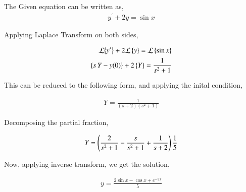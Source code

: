 \documentclass[journal]{IEEEtran}
\begin{document}


    



    
    The Given equation can be written as,
    \begin{align}
        y^\prime + 2y = \sin{x}
    \end{align}

    Applying Laplace Transform on both sides,

    \begin{align}
        \mathcal{L}{\left\{y^\prime\right\}} + 2\mathcal{L}\left\{y\right\} = \mathcal{L}\left\{\sin{x}\right\}\\
        \left\{s\,Y - y(0)\right\} + 2\left\{Y\right\} = \frac{1}{s^2 + 1}
    \end{align}

    This can be reduced to the following form, and applying the inital condition,

    \begin{align}
        Y = \frac{1}{(s+2)(s^2+1)}
    \end{align}

    Decomposing the partial fraction,

    \begin{align}
        Y = \left(\frac{2}{s^2 + 1} - \frac{s}{s^2 + 1} + \frac{1}{s+2}\right)\frac{1}{5}
    \end{align}

    Now, applying inverse transform, we get the solution,

    \begin{align}
        y = \frac{2\sin{x}-\cos{x}+e^{-2x}}{5}
    \end{align}
\end{document}
